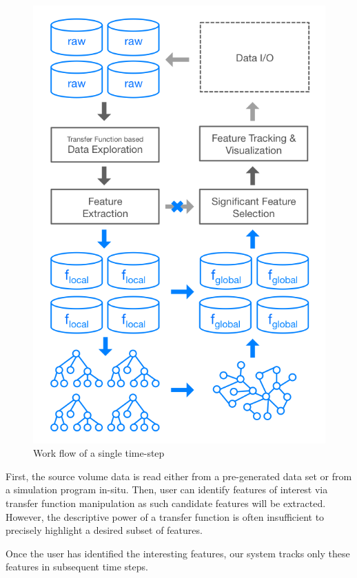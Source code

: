 \documentclass[10pt, conference, compsocconf]{IEEEtran}
\begin{document}
\begin{figure}[ht]
	\centering
	\includegraphics[width=1\linewidth]{system_overview.png}
	\caption{Work flow of a single time-step}
	\label{fig:system-overview}
\end{figure}

First, the source volume data is read either from a pre-generated data set or from a simulation program in-situ. Then, user can identify features of interest via transfer function manipulation as such candidate features will be extracted. However, the descriptive power of a transfer function is often insufficient to precisely highlight a desired subset of features. 

Once the user has identified the interesting features, our system tracks only these features in subsequent time steps.
\end{document}
